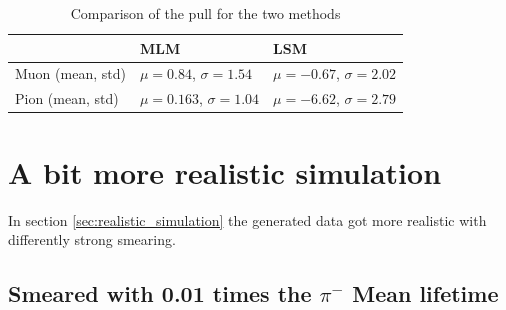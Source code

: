 \documentclass[11pt, a4paper, oneside]{book}
\newcommand{\pion}{$\pi^{-}$}
\newcommand{\muon}{$\mu^{-}$}
\begin{document}

\begin{table}[H]
\centering
  \caption{Comparison of the pull for the two methods}
  \label{tab:pull_results}
  \begin{tabular}{l|ll}
                   & MLM                                & LSM \\ \hline
  Muon (mean, std) & $\mu = 0.84$, $\sigma = 1.54 $     & $\mu = -0.67$, $\sigma = 2.02$  \\
  Pion (mean, std) & $\mu = 0.163$, $\sigma = 1.04$     & $\mu = -6.62$, $\sigma = 2.79$ 
  \end{tabular}
\end{table}


\newpage
\section{A bit more realistic simulation}

In section \ref{sec:realistic_simulation} the generated data got more realistic with differently strong smearing.

\subsection{Smeared with 0.01 times the \texorpdfstring{\pion}{pion} Mean lifetime}
\end{document}
